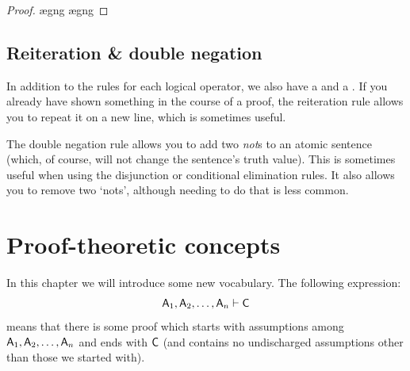 \begin{proof}
	\open
		\ae{gng}
		\ae{gng}
	\close
\end{proof}

\section{Reiteration \& double negation}
In addition to the rules for each logical operator, we also have a  and a . If you already have shown something in the course of a proof, the reiteration rule allows you to repeat it on a new line, which is sometimes useful.  


The double negation rule allows you to add two \textit{not}s to an atomic sentence (which, of course, will not change the sentence's truth value). This is sometimes useful when using the disjunction or conditional elimination rules. It also allows you to remove two `nots', although needing to do that is less common.




\chapter{Proof-theoretic concepts}\label{s:ProofTheoreticConcepts}

In this chapter we will introduce some new vocabulary. The following expression:
$$\mathsf{A}_1, \mathsf{A}_2, \ldots, \mathsf{A}_n \vdash \mathsf{C}$$
means that there is some proof which starts with assumptions among $\mathsf{A}_1, \mathsf{A}_2, \ldots, \mathsf{A}_n$ and ends with $\mathsf{C}$ (and contains no undischarged assumptions other than those we started with).  

